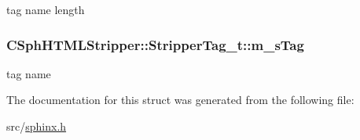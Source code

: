 tag name length 

\hypertarget{structCSphHTMLStripper_1_1StripperTag__t_aea0ab45a652cec5178633227ffa5c51e}{
\subsubsection[{m\-\_\-s\-Tag}]{ C\-Sph\-H\-T\-M\-L\-Stripper\-::\-Stripper\-Tag\-\_\-t\-::m\-\_\-s\-Tag}}\label{structCSphHTMLStripper_1_1StripperTag__t_aea0ab45a652cec5178633227ffa5c51e}


tag name 



The documentation for this struct was generated from the following file\-:\begin{DoxyCompactItemize}
\item 
src/\hyperlink{sphinx_8h}{sphinx.\-h}\end{DoxyCompactItemize}
